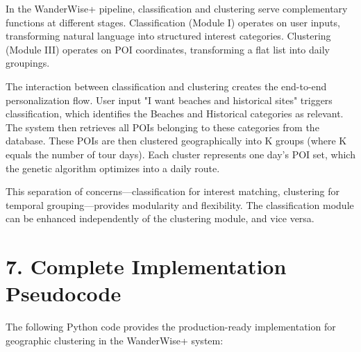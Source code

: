 In the WanderWise+ pipeline, classification and clustering serve complementary functions at different stages. Classification (Module I) operates on user inputs, transforming natural language into structured interest categories. Clustering (Module III) operates on POI coordinates, transforming a flat list into daily groupings.

The interaction between classification and clustering creates the end-to-end personalization flow. User input "I want beaches and historical sites" triggers classification, which identifies the Beaches and Historical categories as relevant. The system then retrieves all POIs belonging to these categories from the database. These POIs are then clustered geographically into K groups (where K equals the number of tour days). Each cluster represents one day's POI set, which the genetic algorithm optimizes into a daily route.

This separation of concerns—classification for interest matching, clustering for temporal grouping—provides modularity and flexibility. The classification module can be enhanced independently of the clustering module, and vice versa.

\section{7. Complete Implementation Pseudocode}

The following Python code provides the production-ready implementation for geographic clustering in the WanderWise+ system:

